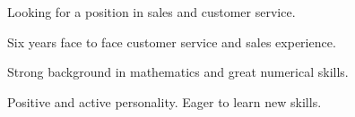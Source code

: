 

\begin{cventries}

  \cventry
    {} %
    {} %
    {} %
    {} %
    {
      \begin{cvitems} %
      \item Looking for a position in sales and customer service.
      \item Six years face to face customer service and sales experience.
      \item Strong background in mathematics and great numerical skills.
      \item Positive and active personality.  Eager to learn new skills.
      \end{cvitems}
    }


\end{cventries}
